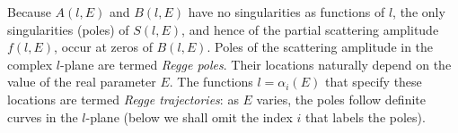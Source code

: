 Because $A(l,E)$ and $B(l,E)$ have no singularities as functions of $l$, the only singularities (poles) of $S(l,E)$, and hence of the partial scattering amplitude $f(l,E)$, occur at zeros of $B(l,E)$. Poles of the scattering amplitude in the complex $l$-plane are termed \emph{Regge poles}. Their locations naturally depend on the value of the real parameter $E$. The functions $l=\alpha_i(E)$ that specify these locations are termed \emph{Regge trajectories}: as $E$ varies, the poles follow definite curves in the $l$-plane (below we shall omit the index $i$ that labels the poles).
